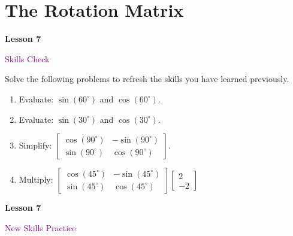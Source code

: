 \documentclass[10pt]{book}
\theoremstyle{definition}
\theoremstyle{remark}
\begin{document}
\section{The Rotation Matrix}
\begin{tcolorbox}[
  width=\textwidth,
  colback=gray!10, %
  colframe=white, %
  boxrule=0pt,    %
  left=1cm,       %
  right=1cm,      %
  sharp corners  %
]

\begin{minipage}[t]{0.5\textwidth}
  \Huge \textbf{Lesson 7}
\end{minipage}%
\hfill
\begin{minipage}[t]{0.5\textwidth}
  \Huge \textcolor{purple}{Skills Check}
\end{minipage}
\end{tcolorbox}

\begin{large}
\noindent
Solve the following problems to refresh the skills you have learned previously.
\begin{enumerate}
\item Evaluate: $\sin(60^{\circ})$ and $\cos(60^{\circ})$.\vfil \vfil \vfil
\item Evaluate: $\sin(30^{\circ})$ and $\cos(30^{\circ})$.\vfil \vfil \vfil
\item Simplify: $\begin{bmatrix} \cos(90^{\circ})&-\sin(90^{\circ}) \\ \sin(90^{\circ})&\cos(90^{\circ}) \end{bmatrix}$.\vfil \vfil \vfil
\item Multiply: $\begin{bmatrix} \cos(45^{\circ})&-\sin(45^{\circ}) \\ \sin(45^{\circ})&\cos(45^{\circ}) \end{bmatrix}\begin{bmatrix} 2 \\ -2 \end{bmatrix}$\vfil \vfil \vfil
\end{enumerate}
\end{large}
\newpage


\begin{tcolorbox}[
  width=\textwidth,
  colback=gray!10, %
  colframe=white, %
  boxrule=0pt,    %
  left=1cm,       %
  right=1cm,      %
  sharp corners  %
]

\begin{minipage}[t]{0.5\textwidth}
  \Huge \textbf{Lesson 7}
\end{minipage}%
\hfill
\begin{minipage}[t]{0.5\textwidth}
  \Huge\textcolor{purple}{New Skills Practice}
\end{minipage}
\end{tcolorbox}
\end{document}
